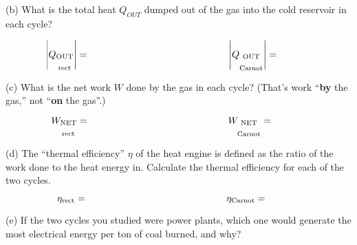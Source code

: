 (b) What is the total heat $Q_{OUT}$ dumped out of the gas into the cold reservoir in each cycle?

\begin{displaymath}
\hspace{-0.5in} \left| Q_{\substack{\textrm{OUT} \\ \\ \textrm{rect}}} \right| =
\hspace{2in} \left| Q_{\substack{\textrm{OUT} \\ \\ \textrm{Carnot}}} \right|=
\end{displaymath}

(c)  What is the net work $W$ done by the gas in each cycle?  (That's work ``\textbf{by} the gas,'' not ``\textbf{on} the gas''.) 

\begin{displaymath}
\hspace{-0.5in} W_{\substack{\textrm{NET} \\ \\ \textrm{rect}}} =
\hspace{2in} W_{\substack{\textrm{NET} \\ \\ \textrm{Carnot}}} =
\end{displaymath}

(d)  The ``thermal efficiency'' $\eta$ of the heat engine is defined as the ratio of the work done to the heat energy in.  Calculate the thermal efficiency for each of the two cycles.

\begin{displaymath}
\hspace{-0.5in} \eta_{\rm rect} =
\hspace{2in} \eta_{\rm Carnot} =
\end{displaymath}

\bigskip

(e) If the two cycles you studied were power plants, which one would generate the most electrical energy per ton of coal burned, and why?





